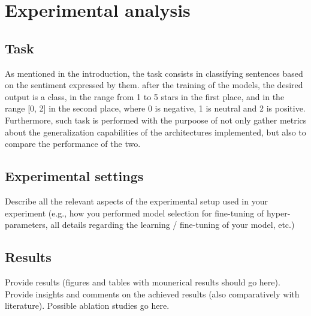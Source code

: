 \section{Experimental analysis}
\label{sec:experimental_analysis}
    \subsection{Task}
      \label{sec:task}
        As mentioned in the introduction, the task consists in classifying sentences
        based on the sentiment expressed by them. after the training of the models,
        the desired output is a class, in the range from 1 to 5 stars in the first place,
        and in the range [0, 2] in the second place, where 0 is negative, 1 is neutral and
        2 is positive. \\
        
        Furthermore, such task is performed with the purpoose of not only gather 
        metrics about the generalization capabilities of the architectures implemented,
        but also to compare the performance of the two.
      

    \subsection{Experimental settings}
    Describe all the relevant aspects of the experimental setup used in your 
    experiment (e.g., how you performed model selection for fine-tuning of 
    hyper-parameters, all details regarding the learning / fine-tuning of your 
    model, etc.)
    \subsection{Results} 
    Provide results (figures and tables with mounerical results should go here). 
    Provide insights and comments on the achieved results (also comparatively with literature). Possible ablation studies go here.